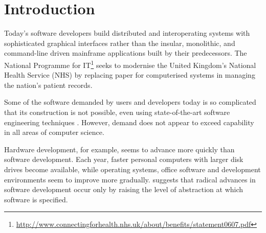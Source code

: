 


\chapter{Introduction}
\label{Introduction}
Today's software developers build distributed and interoperating systems with sophisticated graphical interfaces rather than the insular, monolithic, and command-line driven mainframe applications built by their predecessors. The National Programme for IT\footnote{\url{http://www.connectingforhealth.nhs.uk/about/benefits/statement0607.pdf}} seeks to modernise the United Kingdom's National Health Service (NHS) by replacing paper for computerised systems in managing the nation's patient records. 

Some of the software demanded by users and developers today is so complicated that its construction is not possible, even using state-of-the-art software engineering techniques \cite{selic03pragmatics}. However, demand does not appear to exceed capability in all areas of computer science.


Hardware development, for example, seems to advance more quickly than software development. Each year, faster personal computers with larger disk drives become available, while operating systems, office software and development environments seem to improve more gradually. \cite{brooks86nosilverbullet} suggests that radical advances in software development occur only by raising the level of abstraction at which software is specified.

%  

